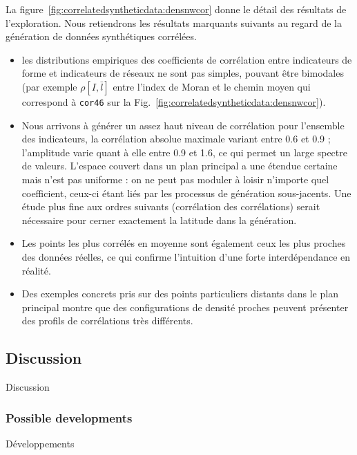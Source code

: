 {La figure~\ref{fig:correlatedsyntheticdata:densnwcor} donne le détail des résultats de l'exploration. Nous retiendrons les résultats marquants suivants au regard de la génération de données synthétiques corrélées.
\begin{itemize}
\item les distributions empiriques des coefficients de corrélation entre indicateurs de forme et indicateurs de réseaux ne sont pas simples, pouvant être bimodales (par exemple $\rho[I,\bar{l}]$ entre l'index de Moran et le chemin moyen qui correspond à \texttt{cor46} sur la Fig.~\ref{fig:correlatedsyntheticdata:densnwcor}). 
\item Nous arrivons à générer un assez haut niveau de corrélation pour l'ensemble des indicateurs, la corrélation absolue maximale variant entre 0.6 et 0.9 ; l'amplitude varie quant à elle entre 0.9 et 1.6, ce qui permet un large spectre de valeurs. L'espace couvert dans un plan principal a une étendue certaine mais n'est pas uniforme : on ne peut pas moduler à loisir n'importe quel coefficient, ceux-ci étant liés par les processus de génération sous-jacents. Une étude plus fine aux ordres suivants (corrélation des corrélations) serait nécessaire pour cerner exactement la latitude dans la génération.
\item Les points les plus corrélés en moyenne sont également ceux les plus proches des données réelles, ce qui confirme l'intuition d'une forte interdépendance en réalité.
\item Des exemples concrets pris sur des points particuliers distants dans le plan principal montre que des configurations de densité proches peuvent présenter des profils de corrélations très différents.
\end{itemize}
}







\subsection{Discussion}{Discussion}


\subsubsection{Possible developments}{Développements}



